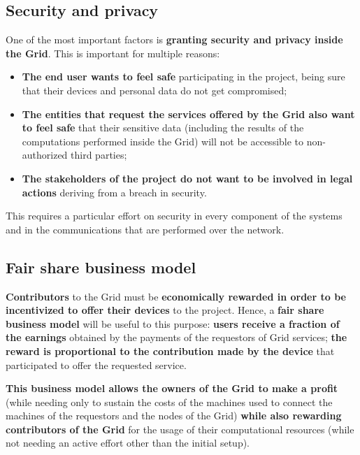 \subsection{Security and privacy}
One of the most important factors is \textbf{granting security and privacy inside the Grid}. This is important for multiple reasons:
\begin{itemize}
    \item \textbf{The end user wants to feel safe }participating in the project, being sure that their devices and personal data do not get compromised;
    \item \textbf{The entities that request the services offered by the Grid also want to feel safe} that their sensitive data (including the results of the computations performed inside the Grid) will not be accessible to non-authorized third parties;
    \item \textbf{The stakeholders of the project do not want to be involved in legal actions} deriving from a breach in security.
\end{itemize}

This requires a particular effort on security in every component of the systems and in the communications that are performed over the network.

\subsection{Fair share business model}
\textbf{Contributors} to the Grid must be \textbf{economically rewarded in order to be incentivized to offer their devices} to the project. Hence, a \textbf{fair share business model} will be useful to this purpose: \textbf{users receive a fraction of the earnings} obtained by the payments of the requestors of Grid services; \textbf{the reward is proportional to the contribution made by the device} that participated to offer the requested service.

\textbf{This business model allows the owners of the Grid to make a profit} (while needing only to sustain the costs of the machines used to connect the machines of the requestors and the nodes of the Grid) \textbf{while also rewarding contributors of the Grid} for the usage of their computational resources (while not needing an active effort other than the initial setup).
